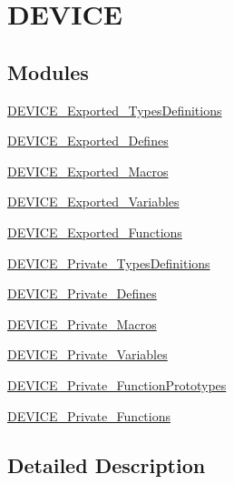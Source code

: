 \hypertarget{group___d_e_v_i_c_e}{}\section{D\+E\+V\+I\+CE}
\label{group___d_e_v_i_c_e}
\subsection*{Modules}
\begin{DoxyCompactItemize}
\item 
\mbox{\hyperlink{group___d_e_v_i_c_e___exported___types_definitions}{D\+E\+V\+I\+C\+E\+\_\+\+Exported\+\_\+\+Types\+Definitions}}
\item 
\mbox{\hyperlink{group___d_e_v_i_c_e___exported___defines}{D\+E\+V\+I\+C\+E\+\_\+\+Exported\+\_\+\+Defines}}
\item 
\mbox{\hyperlink{group___d_e_v_i_c_e___exported___macros}{D\+E\+V\+I\+C\+E\+\_\+\+Exported\+\_\+\+Macros}}
\item 
\mbox{\hyperlink{group___d_e_v_i_c_e___exported___variables}{D\+E\+V\+I\+C\+E\+\_\+\+Exported\+\_\+\+Variables}}
\item 
\mbox{\hyperlink{group___d_e_v_i_c_e___exported___functions}{D\+E\+V\+I\+C\+E\+\_\+\+Exported\+\_\+\+Functions}}
\item 
\mbox{\hyperlink{group___d_e_v_i_c_e___private___types_definitions}{D\+E\+V\+I\+C\+E\+\_\+\+Private\+\_\+\+Types\+Definitions}}
\item 
\mbox{\hyperlink{group___d_e_v_i_c_e___private___defines}{D\+E\+V\+I\+C\+E\+\_\+\+Private\+\_\+\+Defines}}
\item 
\mbox{\hyperlink{group___d_e_v_i_c_e___private___macros}{D\+E\+V\+I\+C\+E\+\_\+\+Private\+\_\+\+Macros}}
\item 
\mbox{\hyperlink{group___d_e_v_i_c_e___private___variables}{D\+E\+V\+I\+C\+E\+\_\+\+Private\+\_\+\+Variables}}
\item 
\mbox{\hyperlink{group___d_e_v_i_c_e___private___function_prototypes}{D\+E\+V\+I\+C\+E\+\_\+\+Private\+\_\+\+Function\+Prototypes}}
\item 
\mbox{\hyperlink{group___d_e_v_i_c_e___private___functions}{D\+E\+V\+I\+C\+E\+\_\+\+Private\+\_\+\+Functions}}
\end{DoxyCompactItemize}


\subsection{Detailed Description}

